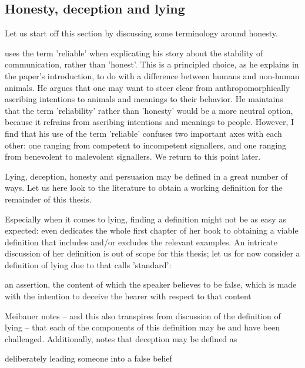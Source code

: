 \subsection{Honesty, deception and lying}





Let us start off this section by discussing some terminology around honesty.

\citet{Scott-Phillips08} uses the term 'reliable' when explicating his story about the stability of communication, rather than 'honest'. This is a principled choice, as he explains in the paper's introduction, to do with a difference between humans and non-human animals. He argues that one may want to steer clear from anthropomorphically ascribing intentions to animals and meanings to their behavior. He maintains that the term 'reliability' rather than 'honesty' would be a more neutral option, because it refrains from ascribing intentions and meanings to people. 
However, I find that his use of the term 'reliable' confuses two important axes with each other: one ranging from competent to incompetent signallers, and one ranging from benevolent to malevolent signallers. We return to this point later.

Lying, deception, honesty and persuasion may be defined in a great number of ways. Let us here look to the literature to obtain a working definition for the remainder of this thesis.

Especially when it comes to lying, finding a definition might not be as easy as expected: \citet{Saul12} even dedicates the whole first chapter of her book to obtaining a viable definition that includes and/or excludes the relevant examples. An intricate discussion of her definition is out of scope for this thesis; let us for now consider a definition of lying due to \citet{Williams02} that \citet{Meibauer18} calls 'standard':
\begin{quoting}
    an assertion, the content of which the speaker believes to be false, which is made with the intention to deceive the hearer with respect to that content
    \hfill \citep[p.~96]{Williams02}
\end{quoting}
Meibauer notes -- and this also transpires from  discussion of the definition of lying -- that each of the components of this definition may be and have been challenged.
Additionally, \citet{Meibauer18} notes that deception may be defined as
\begin{quoting}
    deliberately leading someone into a false belief
    \hfill \citep[.~358]{Meibauer18}
\end{quoting}

